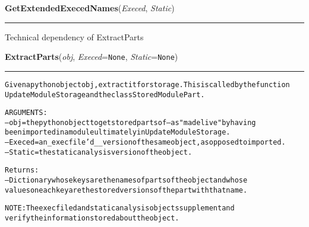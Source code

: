     \label{System:Storage:GetExtendedExecedNames}

    \vspace{0.5ex}

\hspace{.8\funcindent}\begin{boxedminipage}{\funcwidth}

    \raggedright \textbf{GetExtendedExecedNames}(\textit{Execed}, \textit{Static})

    \vspace{-1.5ex}

    \rule{\textwidth}{0.5\fboxrule}
\setlength{\parskip}{2ex}
    Technical dependency of ExtractParts

\setlength{\parskip}{1ex}
    \end{boxedminipage}

    \label{System:Storage:ExtractParts}

    \vspace{0.5ex}

\hspace{.8\funcindent}\begin{boxedminipage}{\funcwidth}

    \raggedright \textbf{ExtractParts}(\textit{obj}, \textit{Execed}={\tt None}, \textit{Static}={\tt None})

    \vspace{-1.5ex}

    \rule{\textwidth}{0.5\fboxrule}
\setlength{\parskip}{2ex}
\begin{alltt}

Given a python object obj, extract it for storage.   This is called by the function
UpdateModuleStorage and the class StoredModulePart. 

ARGUMENTS:
--obj = the python object to get stored parts of --- as "made live" by having 
        been imported in a module ultimately in UpdateModuleStorage.   
--Execed = an \_execfile'd\_\_ version of the same object, as opposed to imported.  
--Static = the static analysis version of the object. 
        
Returns:
--Dictionary whose keys are the names of parts of the object and whose 
values on each key are the stored versions of the part with that name.
        
NOTE:  The execfiled and static analysis objects supplement and 
verify the information stored about the object. 
\end{alltt}

\setlength{\parskip}{1ex}
    \end{boxedminipage}

